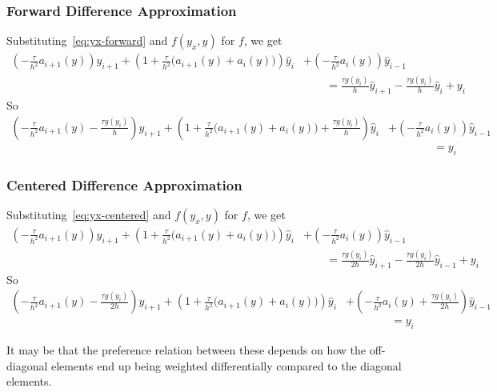 \documentclass[12pt, reqno]{amsart}
\begin{document}
\subsubsection{Forward Difference Approximation}
Substituting~\eqref{eq:yx-forward} and $f(y_{x},y)$ for $f$, we get
\begin{align*}
  \left(- \frac{\tau}{h^{2}}a_{i+1}(y)\right)\hat{y}_{i+1}+\left(1+\frac{\tau}{h^{2}}\big(a_{i+1}(y)+ a_{i}(y)\big)\right)\hat{y}_{i}
   & +\left(- \frac{\tau}{h^{2}}a_{i}(y)\right)\hat{y}_{i-1}
  \\
   & \qquad = \frac{\tau g(y_{i})}{h}\hat{y}_{i+1}-\frac{\tau g(y_{i})}{h}\hat{y}_{i} +y_{i}
\end{align*}
So
\begin{align*}
  \left(- \frac{\tau}{h^{2}}a_{i+1}(y)-\frac{\tau g(y_{i})}{h}\right)\hat{y}_{i+1}+\left(1+\frac{\tau}{h^{2}}\big(a_{i+1}(y)+ a_{i}(y)\big)+\frac{\tau g(y_{i})}{h}\right)\hat{y}_{i}
   & +\left(- \frac{\tau}{h^{2}}a_{i}(y)\right)\hat{y}_{i-1}
  \\
   & \qquad\qquad = y_{i}
\end{align*}
\subsubsection{Centered Difference Approximation}
Substituting~\eqref{eq:yx-centered} and $f(y_{x},y)$ for $f$, we get
\begin{align*}
  \left(- \frac{\tau}{h^{2}}a_{i+1}(y)\right)\hat{y}_{i+1}+\left(1+\frac{\tau}{h^{2}}\big(a_{i+1}(y)+ a_{i}(y)\big)\right)\hat{y}_{i}
   & +\left(- \frac{\tau}{h^{2}}a_{i}(y)\right)\hat{y}_{i-1}
  \\
   & \qquad = \frac{\tau g(y_{i})}{2h}\hat{y}_{i+1}-\frac{\tau g(y_{i})}{2h}\hat{y}_{i-1} +y_{i}
\end{align*}
So
\begin{align*}
  \left(- \frac{\tau}{h^{2}}a_{i+1}(y)-\frac{\tau g(y_{i})}{2h}\right)\hat{y}_{i+1}+\left(1+\frac{\tau}{h^{2}}\big(a_{i+1}(y)+ a_{i}(y)\big)\right)\hat{y}_{i}
   & +\left(- \frac{\tau}{h^{2}}a_{i}(y)+\frac{\tau g(y_{i})}{2h}\right)\hat{y}_{i-1}
  \\
   & \qquad\qquad = y_{i}
\end{align*}

It may be that the preference relation between these depends on how the off-diagonal elements end up being weighted differentially compared to the diagonal elements.
\end{document}
